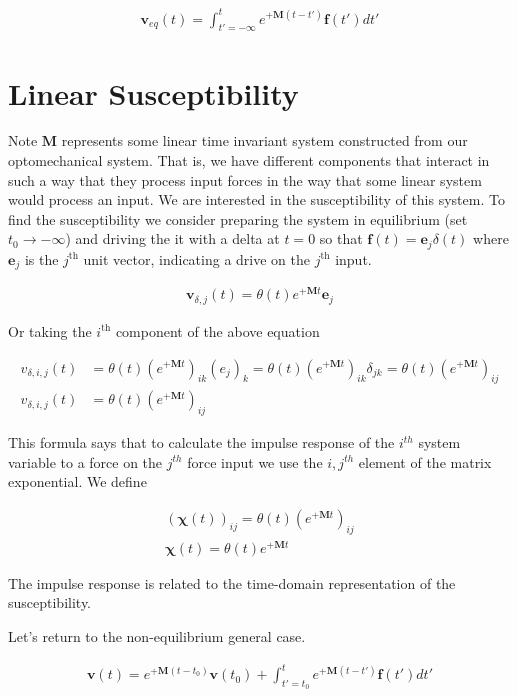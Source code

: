 \documentclass[12pt]{article}
\newcommand{\bv}[1]{\mathbf{#1}}
\begin{document}
\begin{align}
\bv{v}_{eq}(t) = \int_{t'=-\infty}^{t} e^{+\bv{M}(t-t')}\bv{f}(t') dt'
\end{align}


\section*{Linear Susceptibility}

Note $\bv{M}$ represents some linear time invariant system constructed from our optomechanical system. That is, we have different components that interact in such a way that they process input forces in the way that some linear system would process an input. We are interested in the susceptibility of this system. To find the susceptibility we consider preparing the system in equilibrium (set $t_0\rightarrow -\infty$) and driving the it with a delta at $t=0$ so that $\bv{f}(t) = \bv{e}_j \delta(t)$ where $\bv{e}_j$ is the $j^{\text{th}}$ unit vector, indicating a drive on the $j^{\text{th}}$ input.

\begin{align}
\bv{v}_{\delta,j}(t) = \theta(t) e^{+\bv{M}t} \bv{e}_j
\end{align}

Or taking the $i^{\text{th}}$ component of the above equation

\begin{align}
v_{\delta,i,j}(t) &= \theta(t) \left(e^{+\bv{M}t}\right)_{ik}(e_j)_k = \theta(t) \left(e^{+\bv{M}t}\right)_{ik}\delta_{jk} = \theta(t) \left(e^{+\bv{M}t}\right)_{ij}\\ 
v_{\delta,i,j}(t) &= \theta(t) \left(e^{+\bv{M}t}\right)_{ij}
\end{align}

This formula says that to calculate the impulse response of the $i^{th}$ system variable to a force on the $j^{th}$ force input we use the $i,j^{th}$ element of the matrix exponential. We define

\begin{align}
(\boldsymbol{\chi}(t))_{ij} = \theta(t) (e^{+\bv{M}t})_{ij}\\
\boldsymbol{\chi}(t) = \theta(t) e^{+\bv{M}t}
\end{align}

The impulse response is related to the time-domain representation of the susceptibility.

Let's return to the non-equilibrium general case.

\begin{align}
\bv{v}(t) = e^{+\bv{M}(t-t_0)}\bv{v}(t_0) + \int_{t'=t_0}^{t} e^{+\bv{M}(t-t')}\bv{f}(t') dt'
\end{align}
\end{document}
